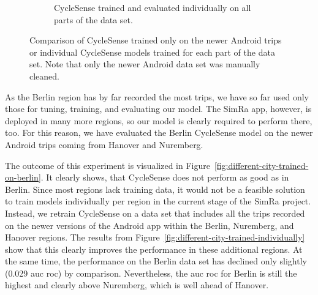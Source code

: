 \begin{figure}[t]
\begin{subfigure}[b]{0.475\textwidth}
		\caption{\small CycleSense trained and evaluated individually on all parts of the data set. \newline}
		\label{fig:individually}
	\end{subfigure}
	\caption{Comparison of CycleSense trained only on the newer Android trips or individual CycleSense models trained for each part of the data set. Note that only the newer Android data set was manually cleaned.}
	\label{fig:comp-trainedonone-individually}
\end{figure}

As the Berlin region has by far recorded the most trips, we have so far used only those for tuning, training, and evaluating our model.
The SimRa app, however, is deployed in many more regions, so our model is clearly required to perform there, too.
For this reason, we have evaluated the Berlin CycleSense model on the newer Android trips coming from Hanover and Nuremberg.

The outcome of this experiment is visualized in Figure~\ref{fig:different-city-trained-on-berlin}.
It clearly shows, that CycleSense does not perform as good as in Berlin.
Since most regions lack training data, it would not be a feasible solution to train models individually per region in the current stage of the SimRa project.
Instead, we retrain CycleSense on a data set that includes all the trips recorded on the newer versions of the Android app within the Berlin, Nuremberg, and Hanover regions.
The results from Figure~\ref{fig:different-city-trained-individually} show that this clearly improves the performance in these additional regions.
At the same time, the performance on the Berlin data set has declined only slightly (0.029 \ac{auc} \ac{roc}) by comparison.
Nevertheless, the \ac{auc} \ac{roc} for Berlin is still the highest and clearly above Nuremberg, which is well ahead of Hanover.

